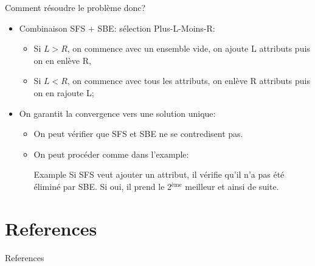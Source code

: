 \documentclass[9pt]{beamer}
\begin{document}
	\begin{frame}{Comment résoudre le problème donc?}
		\begin{itemize}
			\item<1-> Combinaison SFS + SBE\@: sélection Plus-L-Moins-R\@:
			\begin{itemize}
				\item Si $L > R$, on commence avec un ensemble vide, on ajoute L attributs puis on en enlève R\@,
				\item Si $L < R$, on commence avec tous les attributs, on enlève R attributs puis on en rajoute L\@;
			\end{itemize}
			\item<2-> On garantit la convergence vers une solution unique:
			\begin{itemize}
				\item On peut vérifier que SFS et SBE ne se contredisent pas.
				\item On peut procéder comme dans l'example:
				\begin{block}{Example}
					Si SFS veut ajouter un attribut, il vérifie qu'il n'a pas été éliminé par SBE\@. Si oui, il prend le 2$^{\text{ème}}$ meilleur et ainsi de suite.
				\end{block}
			\end{itemize}
		\end{itemize}
	\end{frame}

	\section*{References}
	\begin{frame}[allowframebreaks]{References}
		\nocite{sklearn_api}
		\nocite{camps2009kernel}
		\nocite{CC01a}
		
		
	\end{frame}
\end{document}
